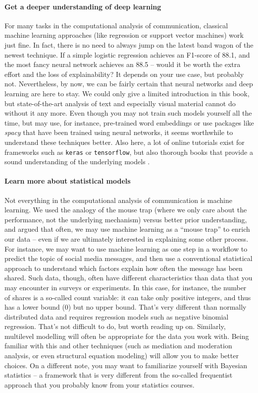 \paragraph{Get a deeper understanding of deep learning} For many tasks in the computational analysis of communication, classical machine learning approaches (like regression or support vector machines) work just fine. In fact, there is no need to always jump on the latest band wagon of the newest technique. If a simple logistic regression achieves an F1-score of 88.1, and the most fancy neural network achieves an 88.5 -- would it be worth the extra effort and the loss of explainability? It depends on your use case, but probably not. Nevertheless, by now, we can be fairly certain that neural networks and deep learning are here to stay. We could only give a limited introduction in this book, but state-of-the-art analysis of text and especially visual material cannot do without it any more. Even though you may not train such models yourself all the time, but may use, for instance, pre-trained word embeddings or use packages like \emph{spacy} that have been trained using neural networks, it seems worthwhile to understand these techniques better. Also here, a lot of online tutorials exist for frameworks such as \texttt{keras} or \texttt{tensorflow}, but also thorough books that provide a sound understanding of the underlying models \cite{goldberg2017}.


\paragraph{Learn more about statistical models} Not everything in the computational analysis of communication is machine learning. We used the analogy of the mouse trap (where we only care about the performance, not the underlying mechanism) versus better prior understanding, and argued that often, we may use machine learning as a ``mouse trap'' to enrich our data -- even if we are ultimately interested in explaining some other process. For instance, we may want to use machine learning as one step in a workflow to predict the topic of social media messages, and then use a conventional statistical approach to understand which factors explain how often the message has been shared. Such data, though, often have different characteristics than data that you may encounter in surveys or experiments. In this case, for instance, the number of shares is a so-called count variable: it can take only positive integers, and thus has a lower bound (0) but no upper bound. That's very different than normally distributed data and requires regression models such as negative binomial regression. That's not difficult to do, but worth  reading up on. Similarly, multilevel modelling will often be appropriate for the data you work with. Being familiar with this and other techniques (such as mediation and moderation analysis, or even structural equation modeling) will allow you to make better choices. On a different note, you may want to familiarize yourself with Bayesian statistics -- a framework that is very different from the so-called frequentist approach that you probably know from your statistics courses.


